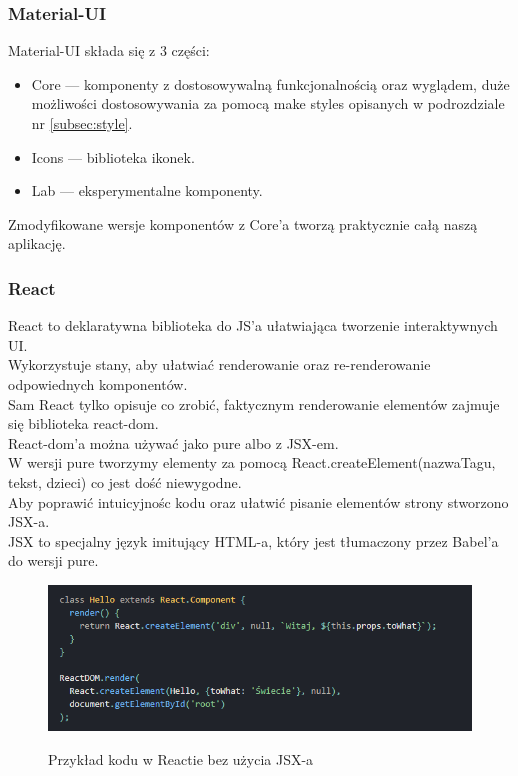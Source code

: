 \documentclass[a4paper,11pt]{report}
\begin{document}
\subsubsection{Material-UI}
Material-UI\cite{material-ui} składa się z 3 części:
\begin{itemize}
	\item Core — komponenty z dostosowywalną funkcjonalnością oraz wyglądem,
		duże możliwości dostosowywania za pomocą make styles opisanych w podrozdziale nr \ref{subsec:style}.
	\item Icons — biblioteka ikonek.
	\item Lab — eksperymentalne komponenty.
\end{itemize}
Zmodyfikowane wersje komponentów z Core'a tworzą praktycznie całą naszą aplikację.

\subsubsection{React}
React\cite{react} to deklaratywna biblioteka do JS'a ułatwiająca tworzenie interaktywnych UI.\\
 Wykorzystuje stany, aby ułatwiać renderowanie oraz re-renderowanie odpowiednych komponentów.\\
 Sam React tylko opisuje co zrobić, faktycznym renderowanie elementów zajmuje się biblioteka react-dom\cite{react-dom}.\\
 React-dom'a można używać jako pure albo z JSX-em.\\
 W wersji pure tworzymy elementy za pomocą React.createElement(nazwaTagu, tekst, dzieci) co jest dość niewygodne.\\
 Aby poprawić intuicyjnośc kodu oraz ułatwić pisanie elementów strony stworzono JSX-a.\\
 JSX to specjalny język imitujący HTML-a, który jest tłumaczony przez Babel'a do wersji pure.\\
 \begin{figure}[H]
	\centering
	\includegraphics[scale=0.5]{implementacja/frontend/react_no_jsx}\\
	\caption{Przykład kodu w Reactie bez użycia JSX-a}
	\label{fig:react_no_jsx}
\end{figure}
\end{document}
